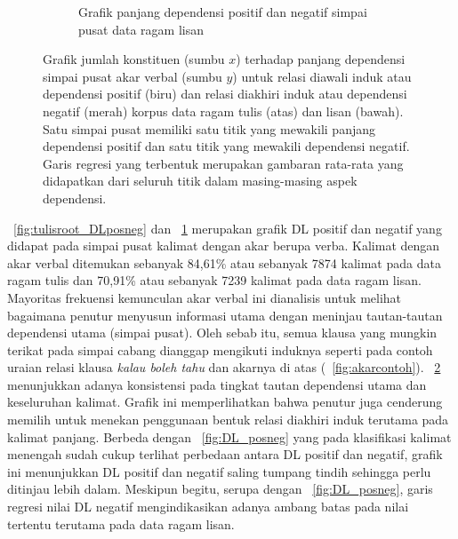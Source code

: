 \begin{figure}
\begin{subfigure}{.7\linewidth}
	\caption{Grafik panjang dependensi positif dan negatif simpai pusat data ragam lisan}
	\label{fig:lisanroot_DLposneg} 
\end{subfigure}

\caption{Grafik jumlah konstituen (sumbu $x$) terhadap panjang dependensi simpai pusat akar verbal (sumbu $y$) untuk relasi diawali induk atau dependensi positif (biru) dan relasi diakhiri induk atau dependensi negatif (merah) korpus data ragam tulis (atas) dan lisan (bawah). Satu simpai pusat memiliki satu titik yang mewakili panjang dependensi positif dan satu titik yang mewakili dependensi negatif. Garis regresi yang terbentuk merupakan gambaran rata-rata yang didapatkan dari seluruh titik dalam masing-masing aspek dependensi.}
\label{fig:rootDL_posneg}
\end{figure}

\pic~\ref{fig:tulisroot_DLposneg} dan \pic~\ref{fig:lisanroot_DLposneg} merupakan grafik DL positif dan negatif yang didapat pada simpai pusat kalimat dengan akar berupa verba. Kalimat dengan akar verbal ditemukan sebanyak 84,61\% atau sebanyak 7874 kalimat pada data ragam tulis dan 70,91\% atau sebanyak 7239 kalimat pada data ragam lisan. Mayoritas frekuensi kemunculan akar verbal ini dianalisis untuk melihat bagaimana penutur menyusun informasi utama dengan meninjau tautan-tautan dependensi utama (simpai pusat). Oleh sebab itu, semua klausa yang mungkin terikat pada simpai cabang dianggap mengikuti induknya seperti pada contoh uraian relasi klausa \textit{kalau boleh tahu} dan akarnya di atas (\pic~\ref{fig:akarcontoh}). \pic~\ref{fig:rootDL_posneg} menunjukkan adanya konsistensi pada tingkat tautan dependensi utama dan keseluruhan kalimat. Grafik ini memperlihatkan bahwa penutur juga cenderung memilih untuk menekan penggunaan bentuk relasi diakhiri induk terutama pada kalimat panjang. Berbeda dengan \pic~\ref{fig:DL_posneg} yang pada klasifikasi kalimat menengah sudah cukup terlihat perbedaan antara DL positif dan negatif, grafik ini menunjukkan DL positif dan negatif saling tumpang tindih sehingga perlu ditinjau lebih dalam. Meskipun begitu, serupa dengan \pic~\ref{fig:DL_posneg}, garis regresi nilai DL negatif mengindikasikan adanya ambang batas pada nilai tertentu terutama pada data ragam lisan.

